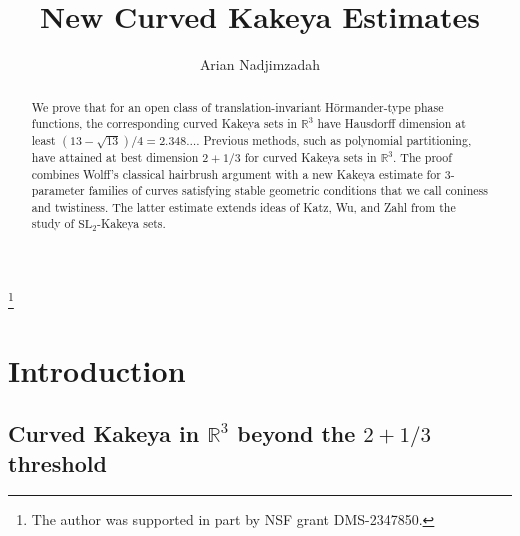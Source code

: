\documentclass[12pt]{amsart}
\numberwithin{equation}{section}
\newcommand{\R}{\mathbb{R}}
\newcommand{\1}{\mathbbm{1}}
\begin{document}
\title[]{New Curved Kakeya Estimates}



\author{Arian Nadjimzadah} \address{Arian Nadjimzadah\\  Deparment of Mathematics, University of California, Los Angeles, USA}
\thanks{The author was supported in part by NSF grant DMS-2347850. }






\maketitle

\begin{abstract}

We prove that for an open class of translation-invariant H\"ormander-type phase functions, the corresponding curved Kakeya sets in $\R^3$ have Hausdorff dimension at least $(13-\sqrt{13})/4 = 2.348\ldots$.
Previous methods, such as polynomial partitioning, have attained at best dimension $2+1/3$ for curved Kakeya sets in $\R^3$. The proof combines Wolff's classical hairbrush argument with a new Kakeya estimate for 3-parameter families of curves satisfying stable geometric conditions that we call coniness and twistiness. The latter estimate extends ideas of Katz, Wu, and Zahl from the study of $\mathrm{SL}_2$-Kakeya sets.  
\end{abstract} 
  

\section{Introduction}\label{sec: 1}

\subsection{Curved Kakeya in $\R^3$ beyond the $2+1/3$ threshold}
\end{document}
